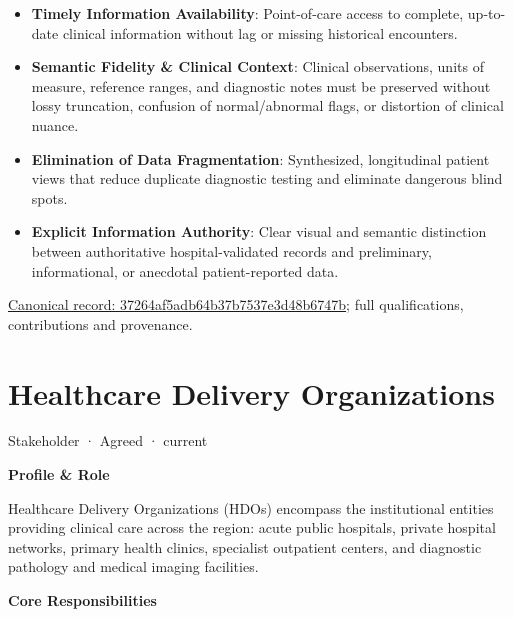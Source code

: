 \begin{itemize}


\item \textbf{Timely Information Availability}: Point-of-care access to complete, up-to-date clinical information without lag or missing historical encounters.

\item \textbf{Semantic Fidelity \& Clinical Context}: Clinical observations, units of measure, reference ranges, and diagnostic notes must be preserved without lossy truncation, confusion of normal/abnormal flags, or distortion of clinical nuance.

\item \textbf{Elimination of Data Fragmentation}: Synthesized, longitudinal patient views that reduce duplicate diagnostic testing and eliminate dangerous blind spots.

\item \textbf{Explicit Information Authority}: Clear visual and semantic distinction between authoritative hospital-validated records and preliminary, informational, or anecdotal patient-reported data.

\end{itemize}

{\footnotesize \href{../../../../continuum/motivation/stakeholder/37264af5adb64b37b7537e3d48b6747b.md}{Canonical record: 37264af5adb64b37b7537e3d48b6747b}; full qualifications, contributions and provenance.}\par
\section{Healthcare Delivery Organizations}

\label{element:31a8e1054c02483a9d5e314a91a91364}
{\small Stakeholder · Agreed · current}\par

\par\medskip\textbf{Profile \& Role}\par


Healthcare Delivery Organizations (HDOs) encompass the institutional entities providing clinical care across the region: acute public hospitals, private hospital networks, primary health clinics, specialist outpatient centers, and diagnostic pathology and medical imaging facilities.



\par\medskip\textbf{Core Responsibilities}\par


